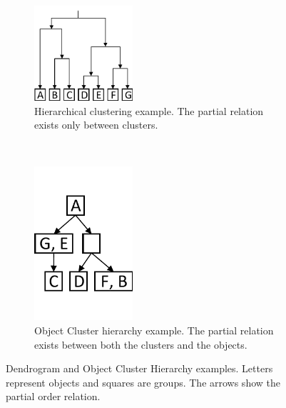 \noindent
\begin{figure}[ht!]
  \centering
  \begin{subfigure}[t]{0.5\textwidth}
  	\centering
    \includegraphics[width=0.40\textwidth]{hierarchical-clustering-example2}
	\caption{Hierarchical clustering example. The partial relation exists only between clusters.} \label{fig:hierarchical-example} 
  \end{subfigure}%
  ~
  \begin{subfigure}[t]{0.5\textwidth}
  	\centering
    \includegraphics[width=0.40\textwidth, trim={0 1.15cm 0 1.15cm}, clip]{OCH-clustering-example}
	\caption{Object Cluster hierarchy example. The partial relation exists between both the clusters and the objects.} \label{fig:och-example} 
  \end{subfigure}
  \caption{Dendrogram and Object Cluster Hierarchy examples. Letters represent objects and squares are groups. The arrows show the partial order relation.}
\end{figure}